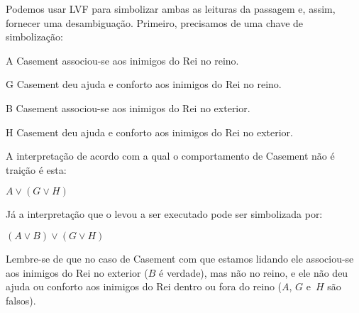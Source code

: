 Podemos usar LVF para simbolizar ambas as leituras da passagem e, assim, fornecer uma desambiguação. Primeiro, precisamos de uma chave de simbolização:
\begin{ekey}
	\item [A] Casement associou-se aos inimigos do Rei no reino.
	\item [G] Casement deu ajuda e conforto aos inimigos do Rei no reino.
	\item [B] Casement associou-se aos inimigos do Rei no exterior.
	\item [H] Casement deu ajuda e conforto aos inimigos do Rei no exterior.
\end{ekey}
A interpretação de acordo com a qual o comportamento de Casement não é traição é esta:
\begin{earg}
	\item [] $A \lor (G \lor H)$
\end{earg}
Já a interpretação que o levou a ser executado pode ser simbolizada por:
\begin{earg}
	\item [] $(A \lor B) \lor (G \lor H)$
\end{earg}
Lembre-se de que no caso de Casement com que estamos lidando ele associou-se aos inimigos do Rei no exterior ($B$ é verdade), mas não no reino, e ele não deu ajuda ou conforto aos inimigos do Rei dentro ou fora do reino ($A$, $G$ e~$H$ são falsos). 

